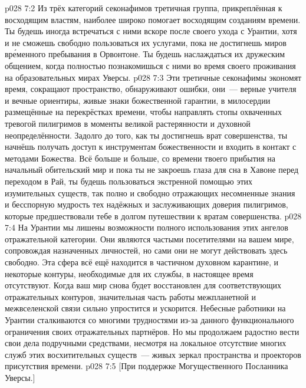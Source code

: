 \vs p028 7:2 \pc Из трёх категорий секонафимов третичная группа, прикреплённая к восходящим властям, наиболее широко помогает восходящим созданиям времени. Ты будешь иногда встречаться с ними вскоре после своего ухода с Урантии, хотя и не сможешь свободно пользоваться их услугами, пока не достигнешь миров вр\'еменного пребывания в Орвонтоне. Ты будешь наслаждаться их дружеским общением, когда полностью познакомишься с ними во время своего проживания на образовательных мирах Уверсы.
\vs p028 7:3 Эти третичные секонафимы экономят время, сокращают пространство, обнаруживают ошибки, они~--- верные учителя и вечные ориентиры, живые знаки божественной гарантии, в милосердии размещённые на перекрёстках времени, чтобы направлять стопы охваченных тревогой пилигримов в моменты великой растерянности и духовной неопределённости. Задолго до того, как ты достигнешь врат совершенства, ты начнёшь получать доступ к инструментам божественности и входить в контакт с методами Божества. Всё больше и больше, со времени твоего прибытия на начальный обительский мир и пока ты не закроешь глаза для сна в Хавоне перед переходом в Рай, ты будешь пользоваться экстренной помощью этих изумительных существ, так полно и свободно отражающих несомненные знания и бесспорную мудрость тех надёжных и заслуживающих доверия пилигримов, которые предшествовали тебе в долгом путешествии к вратам совершенства.
\vs p028 7:4 На Урантии мы лишены возможности полного использования этих ангелов отражательной категории. Они являются частыми посетителями на вашем мире, сопровождая назначенных личностей, но сами они не могут действовать здесь свободно. Эта сфера всё ещё находится в частичном духовном карантине, и некоторые контуры, необходимые для их службы, в настоящее время отсутствуют. Когда ваш мир снова будет восстановлен для соответствующих отражательных контуров, значительная часть работы межпланетной и межвселенской связи сильно упростится и ускорится. Небесные работники на Урантии сталкиваются со многими трудностями из-за данного функционального ограничения своих отражательных партнёров. Но мы продолжаем радостно вести свои дела подручными средствами, несмотря на локальное отсутствие многих служб этих восхитительных существ~--- живых зеркал пространства и проекторов присутствия времени.
\vsetoff
\vs p028 7:5 [При поддержке Могущественного Посланника Уверсы.]
\quizlink
